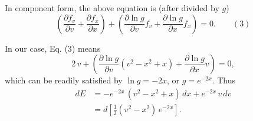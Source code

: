 In component form, the above equation is (after divided by $g$)
$$
\left( \frac{\partial f_v}{\partial v}
+\frac{\partial f_x}{\partial x} \right)
+\left(
\frac{\partial \ln g }{\partial v} f_v
+\frac{\partial \ln g }{\partial x} f_x
\right)
=0.
\quad \quad (3)
$$


In our case, Eq. (3) means
$$
2 \, v
+\left(
\frac{\partial \ln g }{\partial v} (v^2 - x^2 + x)
+\frac{\partial \ln g }{\partial x} v
\right)
=0,
$$
which can be readily satisfied by $\ln g = -2 x$, or $g = e^{-2x}$.  Thus
$$
\begin{aligned}
dE
&= -e^{-2x} \, (v^2 - x^2 + x) \, dx + e^{-2x} \, v \, dv \\
&= d\left[ \frac12(v^2 - x^2) \, e^{-2x} \right].
\end{aligned}
$$

